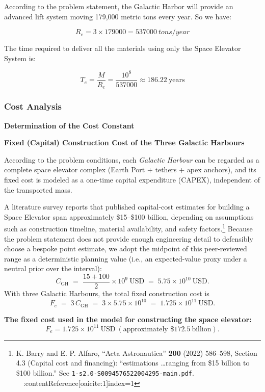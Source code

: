 \documentclass{mcmthesis}
\begin{document}
According to the problem statement, the Galactic Harbor will provide an advanced lift system moving 179,000 metric tons every year. So we have:

\[R_e=3\times179000=\SI{537000}{tons/year}\]

The time required to deliver all the materials using only the Space Elevator System is:

\[T_e=\frac{M}{R_e} = \frac{10^8}{537000} \approx 186.22\ \text{years}\]

\subsubsection{Cost Analysis}

\textbf{Determination of the Cost Constant}

\textbf{Fixed (Capital) Construction Cost of the Three Galactic Harbours}

According to the problem conditions, each \emph{Galactic Harbour} can be regarded as a complete space elevator complex (Earth Port + tethers + apex anchors), and its fixed cost is modeled as a one-time capital expenditure (CAPEX), independent of the transported mass.

A literature survey reports that published capital-cost estimates for building a Space Elevator span approximately \$15--\$100 billion, depending on assumptions such as construction timeline, material availability, and safety factors.\footnote{K. Barry and E. P. Alfaro, ``Acta Astronautica'' \textbf{200} (2022) 586--598, Section 4.3 (Capital cost and financing): ``estimations \dots ranging from \$15 billion to \$100 billion.'' See \texttt{1-s2.0-S0094576522004295-main.pdf}. \ \ :contentReference[oaicite:1]{index=1}}
Because the problem statement does not provide enough engineering detail to defensibly choose a bespoke point estimate, we adopt the midpoint of this peer-reviewed range as a deterministic planning value (i.e., an expected-value proxy under a neutral prior over the interval):
\[
    C_{\mathrm{GH}} \;=\; \frac{15+100}{2}\times 10^{9}\ \mathrm{USD}
    \;=\; 5.75\times 10^{10}\ \mathrm{USD}.
\]
With three Galactic Harbours, the total fixed construction cost is
\[
    F_e
    \;=\; 3\,C_{\mathrm{GH}}
    \;=\; 3\times 5.75\times 10^{10}
    \;=\; 1.725\times 10^{11}\ \mathrm{USD}.
\]

\noindent\textbf{The fixed cost used in the model for constructing the space elevator:}
\[
    \boxed{F_e = 1.725\times 10^{11}\ \mathrm{USD}\ (\text{approximately } \$172.5\ \text{billion})}.
\]
\end{document}
